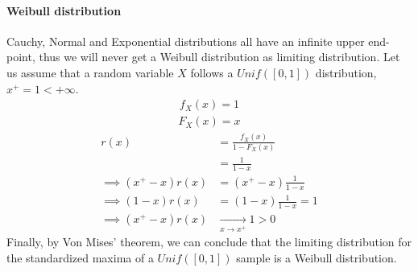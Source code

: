 \paragraph{Weibull distribution}
Cauchy, Normal and Exponential distributions all have an infinite upper end-point, thus we will never get a Weibull distribution as limiting distribution. Let us assume that a random variable $X$ follows a $Unif([0,1])$ distribution, $x^+ = 1 < + \infty$. 
\begin{equation}
\begin{alignat*}{2}
f_X(x) = 1
\end{alignat*}
\end{equation}
\begin{equation}
\begin{alignat*}{2}
F_X(x) =  x
\end{alignat*}
\end{equation}
\begin{equation}
\begin{alignat*}{2}
r(x) &= \frac{f_X(x)}{1 - F_X(x)} \\
&= \frac{1}{1 - x} \\
\implies (x^+ - x) r(x) &= (x^+ - x) \frac{1}{1 - x} \\
\implies (1 - x) r(x) &= (1 - x) \frac{1}{1 - x} = 1 \\
\implies (x^+ - x) r(x) &\xrightarrow[x \rightarrow x^+]{} 1 > 0
\end{alignat*}
\end{equation}
Finally, by Von Mises' theorem, we can conclude that the limiting distribution for the standardized maxima of a $Unif([0,1])$ sample is a Weibull distribution.